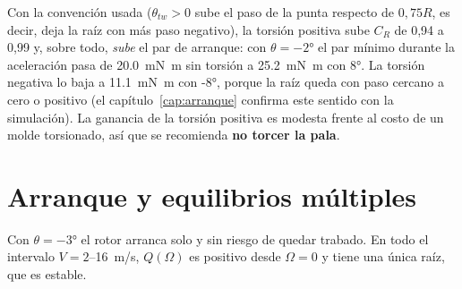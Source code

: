 Con la convención usada ($\theta_{tw}>0$ sube el paso de la punta respecto de $0{,}75R$, es
decir, deja la raíz con más paso negativo), la torsión positiva sube $C_R$ de 0,94 a 0,99
y, sobre todo, \emph{sube} el par de arranque: con $\theta=\ang{-2}$ el par mínimo durante
la aceleración pasa de \SI{20.0}{mN.m} sin torsión a \SI{25.2}{mN.m} con \ang{+8}. La
torsión negativa lo baja a \SI{11.1}{mN.m} con \ang{-8}, porque la raíz queda con paso
cercano a cero o positivo (el capítulo~\ref{cap:arranque} confirma este sentido con la
simulación). La ganancia de la torsión positiva es modesta frente al costo de un molde
torsionado, así que se recomienda \textbf{no torcer la pala}.

\section{Arranque y equilibrios múltiples}\label{sec:bemt-arranque}

Con $\theta=\ang{-3}$ el rotor arranca solo y sin riesgo de quedar trabado. En todo el
intervalo $V=2$--\SI{16}{m/s}, $Q(\Omega)$ es positivo desde $\Omega=0$ y tiene una
única raíz, que es estable.

